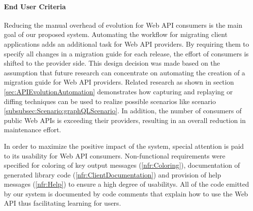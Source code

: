 \paragraph{End User Criteria}
Reducing the manual overhead of evolution for Web API consumers is the main goal of our proposed system. Automating the workflow for migrating client applications adds an additional task for Web API providers. By requiring them to specify all changes in a migration guide for each release, the effort of consumers is shifted to the provider side. This design decision was made based on the assumption that future research can concentrate on automating the creation of a migration guide for Web API providers. Related research as shown in section \ref{sec:APIEvolutionAutomation} demonstrates how capturing and replaying or diffing techniques can be used to realize possible scenarios like scenario \ref{subsubsec:Scenario:graphQLScenario}. In addition, the number of consumers of public Web APIs is exceeding their providers, resulting in an overall reduction in maintenance effort. 

In order to maximize the positive impact of the system, special attention is paid to its usability for Web API consumers. Non-functional requirements were specified for coloring of key output messages (\ref{nfr:Coloring}), documentation of generated library code (\ref{nfr:ClientDocumentation}) and provision of help messages (\ref{nfr:Help}) to ensure a high degree of usabilitys. All of the code emitted by our system is documented by code comments that explain how to use the Web API thus facilitating learning for users.